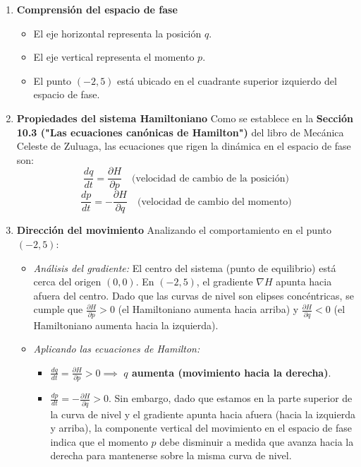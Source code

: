 \documentclass[a4paper]{article}
\begin{document}
\begin{enumerate}
    \item \textbf{Comprensión del espacio de fase}
    \begin{itemize}
        \item El eje horizontal representa la posición $q$.
        \item El eje vertical representa el momento $p$.
        \item El punto $(-2, 5)$ está ubicado en el cuadrante superior izquierdo del espacio de fase.
    \end{itemize}

    \item \textbf{Propiedades del sistema Hamiltoniano}
    Como se establece en la \textbf{Sección 10.3 ("Las ecuaciones canónicas de Hamilton")} del libro de Mecánica Celeste de Zuluaga, las ecuaciones que rigen la dinámica en el espacio de fase son:
    $$ \frac{dq}{dt} = \frac{\partial H}{\partial p} \quad \text{(velocidad de cambio de la posición)} $$
    $$ \frac{dp}{dt} = -\frac{\partial H}{\partial q} \quad \text{(velocidad de cambio del momento)} $$

    \item \textbf{Dirección del movimiento}
    Analizando el comportamiento en el punto $(-2, 5)$:
    \begin{itemize}
        \item \textit{Análisis del gradiente:} El centro del sistema (punto de equilibrio) está cerca del origen $(0,0)$. En $(-2, 5)$, el gradiente $\nabla H$ apunta hacia afuera del centro. Dado que las curvas de nivel son elipses concéntricas, se cumple que $\frac{\partial H}{\partial p} > 0$ (el Hamiltoniano aumenta hacia arriba) y $\frac{\partial H}{\partial q} < 0$ (el Hamiltoniano aumenta hacia la izquierda).
        \item \textit{Aplicando las ecuaciones de Hamilton:}
        \begin{itemize}
            \item $\frac{dq}{dt} = \frac{\partial H}{\partial p} > 0 \implies$ \textbf{$q$ aumenta (movimiento hacia la derecha)}.
            \item $\frac{dp}{dt} = -\frac{\partial H}{\partial q} > 0$. Sin embargo, dado que estamos en la parte superior de la curva de nivel y el gradiente apunta hacia afuera (hacia la izquierda y arriba), la componente vertical del movimiento en el espacio de fase indica que el momento $p$ debe disminuir a medida que avanza hacia la derecha para mantenerse sobre la misma curva de nivel.
        \end{itemize}
    \end{itemize}


\end{enumerate}
\end{document}
